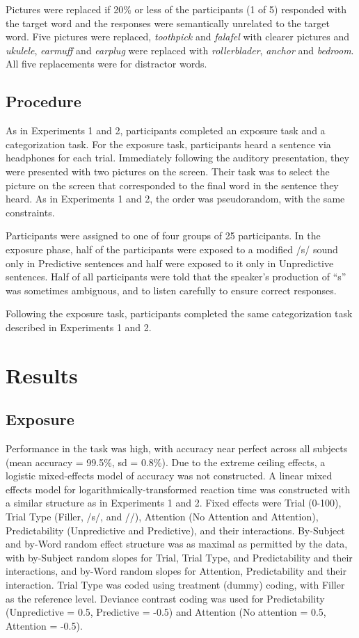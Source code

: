 Pictures were replaced if 20\% or less of the participants (1 of 5) responded with the target word and the responses were semantically unrelated to the target word. 
Five pictures were replaced, \emph{toothpick} and \emph{falafel} with clearer pictures and \emph{ukulele}, \emph{earmuff} and \emph{earplug} were replaced with \emph{rollerblader}, \emph{anchor} and \emph{bedroom}.  
All five replacements were for distractor words.

\subsection{Procedure}

As in Experiments 1 and 2, participants completed an exposure task and a categorization task.  
For the exposure task, participants heard a sentence via headphones for each trial.  
Immediately following the auditory presentation, they were presented with two pictures on the screen.  Their task was to select the picture on the screen that corresponded to the final word in the sentence they heard.  As in Experiments 1 and 2, the order was pseudorandom, with the same constraints.

Participants were assigned to one of four groups of 25 participants.  
In the exposure phase, half of the participants were exposed to a modified /s/ sound only in Predictive sentences and half were exposed to it only in Unpredictive sentences.  
Half of all participants were told that the speaker's production of ``s'' was sometimes ambiguous, and to listen carefully to ensure correct responses.  

Following the exposure task, participants completed the same categorization task described in Experiments 1 and 2.

\section{Results}

\subsection{Exposure}

Performance in the task was high, with accuracy near perfect across all subjects (mean accuracy = 99.5\%, sd = 0.8\%).
Due to the extreme ceiling effects, a logistic mixed-effects model of accuracy was not constructed.  
A linear mixed effects model for logarithmically-transformed reaction time was constructed with a similar structure as in Experiments 1 and 2.
Fixed effects were Trial (0-100), Trial Type (Filler, /s/, and /\textesh/), Attention (No Attention and Attention), Predictability (Unpredictive and Predictive), and their interactions.  By-Subject and by-Word random effect structure was as maximal as permitted by the data, with by-Subject random slopes for Trial, Trial Type, and Predictability and their interactions, and by-Word random slopes for Attention, Predictability and their interaction. 
Trial Type was coded using treatment (dummy) coding, with Filler as the reference level. 
Deviance contrast coding was used for Predictability (Unpredictive = 0.5, Predictive = -0.5) and Attention (No attention = 0.5, Attention = -0.5).

